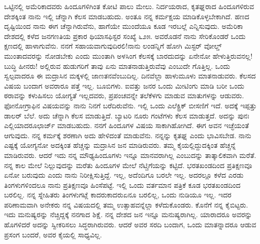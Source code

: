ಒಟ್ಟಿನಲ್ಲಿ ಅಮೆರಿಕಾದವರು ಹಿಂದೂಗಳಿಗಿಂತ ಕೋಟಿ ಪಾಲು ಮೇಲು. ನಿರ್ದಯರಾದ, ಕೃತಘ್ನರಾದ ಹಿಂದೂಗಳಿರುವ ದೇಶಕ್ಕಿಂತ ನಾನು ಇಲ್ಲಿ ಚೆನ್ನಾಗಿ ಕೆಲಸ ಮಾಡಬಹುದು. ಅಂತೂ ನನ್ನ ಕರ್ಮಕ್ಷಯ ಮಾಡಿಕೊಳ್ಳಬೇಕಾಗಿದೆ. ಹಣದ ದೃಷ್ಟಿಯಿಂದ ನಾನು ಈಗ ಚೆನ್ನಾಗಿರುವೆನು, ಹಾಗೆಯೇ ಮುಂದೆಯೂ ಕೂಡ ಇರಬಲ್ಲೆ ಎನ್ನಿಸುವುದು. ಅಮೆರಿಕಾ ದೇಶದಲ್ಲಿ ಕಳೆದ ಜನಗಣತಿಯ ಪ್ರಕಾರ ಥಿಯಾಸಫಿಸ್ಟರ ಸಂಖ್ಯೆ ೬೨೫. ಅವರೊಡನೆ ನಾನು ಸೇರಿಕೊಂಡರೆ ಒಂದು ಕ್ಷಣದಲ್ಲಿ ಹಾಳಾಗುವೆನು. ನನಗೆ ಸಹಾಯವಾಗುವುದಿರಲಿ!ನಾನು ಲಂಡನ್ನಿಗೆ ಹೋಗಿ ಮಿಸ್ಟರ್ ವೋಲ್ಡ್ ಮುಂತಾದವರನ್ನು ನೋಡಬೇಕು ಎಂದು ಮುಂತಾಗಿ ಅಳಸಿಂಗ ಕೆಲಸಕ್ಕೆ ಬಾರದುದನ್ನು ಏನೇನೋ ಹೇಳುತ್ತಿರುವನಲ್ಲ! ಬುದ್ಧಿ ಹೀನರು! ಅಲ್ಲಿರುವ ಹುಡುಗರಿಗೆ ತಾವು ಏನು ಮಾತನಾಡುತ್ತಿರುವೆವು ಎಂಬುದೇ ಗೊತ್ತಿಲ್ಲ. ಒಂದು ಸ್ವಲ್ಪವಾದರೂ ಈ ಮದ್ರಾಸಿನ ಮಕ್ಕಳಲ್ಲಿ ಜಾಣತನವೆಂಬುದಿಲ್ಲ. ದಿನವೆಲ್ಲಾ ಹಾಳುಮೂಳು ಮಾತನಾಡುವರು. ಕೆಲಸದ ವಿಷಯ ಬಂದಾಗ ಅವರಾರೂ ಪತ್ತೆ ಇಲ್ಲ. ಬೂಬಿಗಳು. ಐವತ್ತು ಜನರ ಒಂದು ಮೀಟಿಂಗು ಮಾಡಿ ಬರೀ ಒಂದು ಠರಾವನ್ನು ಕಳುಹಿಸಲು ಯೋಗ್ಯತೆ ಇಲ್ಲದವರು, ಪ್ರಪಂಚವನ್ನೇ ತಲೆಕೆಳಗು ಮಾಡುವ ಮಾತುಗಳನ್ನು ಆಡುವರು. ಫೋನೋಗ್ರಾಫಿನ ವಿಷಯವನ್ನು ನಾನು ನಿನಗೆ ಬರೆದಿರುವೆನು. ಇಲ್ಲಿ ಒಂದು ಎಲೆಕ್ಟ್ರಿಕ್ ಬೀಸಣಿಗೆ ಇದೆ. ಅದಕ್ಕೆ ಇಪ್ಪತ್ತು ಡಾಲರ್ ಬೆಲೆ. ಅದು ಚೆನ್ನಾಗಿ ಕೆಲಸ ಮಾಡುತ್ತಿದೆ. ಬ್ಯಾಟರಿ ನೂರು ಗಂಟೆಗಳು ಕೆಲಸ ಮಾಡುತ್ತದೆ. ಅದನ್ನು ಪುನಃ ಎಲ್ಲಿಯಾದರೂಛಾರ್ಜ್ ಮಾಡಬಹುದು. ನನಗೆ ಹಿಂದೂಗಳ ವಿಷಯ ಸಾಕಾಗಿಹೋಗಿದೆ. ಈಗ ಅವನ ಇಚ್ಛೆಯಂತೆ ಆಗುವುದು. ನನ್ನ ಕರ್ಮಕ್ಕೆ ಶರಣಾಗಿ ಅದು ಹೇಳಿದಂತೆ ಮಾಡುವೆನು. ನನ್ನನ್ನು ಕೃತಘ್ನ ಎಂದು ಭಾವಿಸಬೇಡ. ನಾನು ಎಷ್ಟಕ್ಕೆ ಯೋಗ್ಯನೋ ಅದಕ್ಕಿಂತ ಹೆಚ್ಚನ್ನು ಮದ್ರಾಸಿನ ಜನ ಮಾಡಿರುವರು. ತಮ್ಮ ಕೈಯಲ್ಲಿದ್ದುದಕ್ಕಿಂತ ಹೆಚ್ಚನ್ನೆ ಮಾಡಿರುವರು. ಆದರೆ ಇದು ನನ್ನ ಮೌಢ್ಯ\enginline{-}ಹಿಂದೂಗಳು ಇನ್ನೂ ಮಾನವರಾಗಿಲ್ಲ ಎಂಬುದನ್ನು ತಾತ್ಕಾಲಿಕವಾಗಿ ಮರೆತೆ. ನನ್ನ ಕಾಲ ಮೇಲೆ ನಿಲ್ಲುವುದನ್ನು ಮರೆತು ಹಿಂದೂಗಳ ಮೇಲೆ ನೆಟ್ಚಿಗೆಯನ್ನು ಕಟ್ಟಿದೆ. ಭರತಖಂಡದಿಂದ ಪ್ರತಿಕ್ಷಣವೂ ಏನೋ ಬರುವುದು ಎಂದು ನಾನು ನಿರೀಕ್ಷಿಸುತ್ತಿದ್ದೆ. ಇಲ್ಲ, ಅದೆಂದಿಗೂ ಬರಲೇ ಇಲ್ಲ. ಅದರಲ್ಲೂ ಕಳೆದ ಎರಡು ತಿಂಗಳುಗಳಿಂದಲೂ ನಾನು ಪ್ರತಿಕ್ಷಣವೂ ಹಿಂಸೆಪಟ್ಟೆ. ಇಲ್ಲಿ ಒಂದು ವರ್ತಮಾನ ಪತ್ರಿಕೆ ಕೂಡ ಭರತಖಂಡದಿಂದ ಬರಲಿಲ್ಲ. ನನ್ನ ಸ್ನೇಹಿತರು ತಿಂಗಳುಗಟ್ಲೆ ಕಾದರು\enginline{-}ಕಾದರು\enginline{-}ಏನೂ ಬರಲಿಲ್ಲ, ಒಂದು ನುಡಿಯೂ ಇಲ್ಲ. ಇದರ ಪರಿಣಾಮವಾಗಿ ಅನೇಕರು ನನ್ನ ವಿಷಯದಲ್ಲಿ ತಮ್ಮ ಉತ್ಸಾಹವನ್ನೆಲ್ಲಾ ಕಳೆದುಕೊಂಡರು. ಕೊನೆಗೆ ನನ್ನ ಕೈಬಿಟ್ಟರು. ಇದು ಮನುಷ್ಯರನ್ನು ನೆಚ್ಚಿದ್ದಕ್ಕೆ ನನಗಾದ ಶಿಕ್ಷೆ. ನನ್ನ ದೇಶದ ಜನ ಇನ್ನೂ ಮನುಷ್ಯರಾಗಿಲ್ಲ. ಯಾರಾದರೂ ಅವರನ್ನು ಹೊಗಳಿದರೆ ಅದನ್ನು ಸ್ವೀಕರಿಸಲು ಸಿದ್ಧರಾಗಿರುವರು. ಆದರೆ ಅವರ ಸರದಿ ಬಂದಾಗ, ಒಂದು ಮಾತನ್ನಾದರೂ ಆಡುವ ಪ್ರಸಂಗ ಬಂದರೆ, ಅವರ ಕೈಯಲ್ಲಿ ಸಾಧ್ಯವಿಲ್ಲ.

